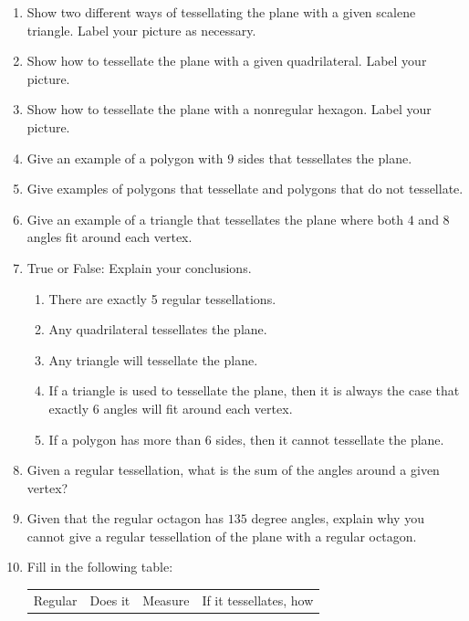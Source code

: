 


\begin{problems}

\begin{enumerate}
\item Show two different ways of tessellating the plane with a given scalene triangle. Label your picture as necessary.
\item Show how to tessellate the plane with a given quadrilateral. Label your picture.
\item Show how to tessellate the plane with a nonregular hexagon. Label your picture.
\item Give an example of a polygon with $9$ sides that tessellates the plane.
\item Give examples of polygons that tessellate and polygons that do
  not tessellate.
\item Give an example of a triangle that tessellates the plane where
  both $4$ and $8$ angles fit around each vertex.
\item True or False: Explain your conclusions.
\begin{enumerate}
\item There are exactly 5 regular tessellations.
\item Any quadrilateral tessellates the plane.
\item Any triangle will tessellate the plane.
\item If a triangle is used to tessellate the plane, then it is always
  the case that exactly $6$ angles will fit around each vertex.
\item If a polygon has more than 6 sides, then it cannot tessellate the plane.
\end{enumerate}
\item Given a regular tessellation, what is the sum of the angles
  around a given vertex?
\item Given that the regular octagon has $135$ degree angles, explain
  why you cannot give a regular tessellation of the plane with a
  regular octagon.
\item \label{tesstable} Fill in the following table:
\begin{center}
\begin{tabular}{|c || c| c| c|}\hline
 Regular & Does it      &  Measure & If it tessellates, how  \\

\end{tabular}
\end{center}
\end{enumerate}
\end{problems}

